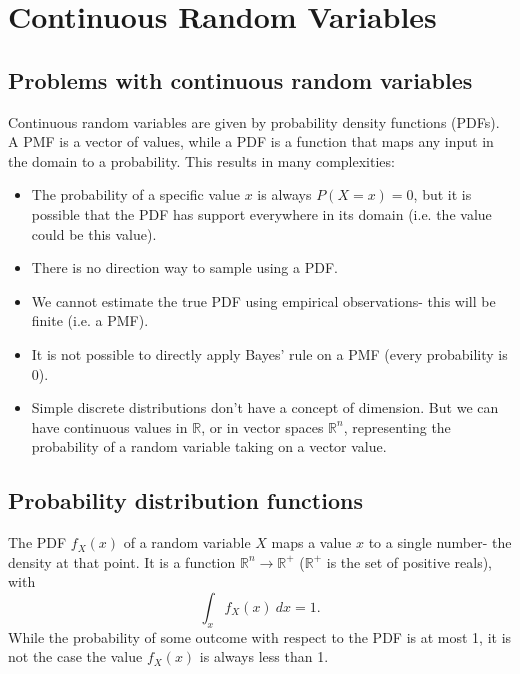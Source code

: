 \documentclass[a4paper, openany]{memoir}
\begin{document}
\section{Continuous Random Variables}
\subsection{Problems with continuous random variables}
Continuous random variables are given by probability density functions (PDFs). A PMF is a vector of values, while a PDF is a function that maps any input in the domain to a probability. This results in many complexities:
\begin{itemize}
    \item The probability of a specific value $x$ is always $P(X = x) = 0$, but it is possible that the PDF has support everywhere in its domain (i.e. the value could be this value).
    \item There is no direction way to sample using a PDF.
    \item We cannot estimate the true PDF using empirical observations- this will be finite (i.e. a PMF).
    \item It is not possible to directly apply Bayes' rule on a PMF (every probability is 0).
    \item Simple discrete distributions don't have a concept of dimension. But we can have continuous values in $\mathbb{R}$, or in vector spaces $\mathbb{R}^n$, representing the probability of a random variable taking on a vector value.
\end{itemize}

\subsection{Probability distribution functions}
The PDF $f_X(x)$ of a random variable $X$ maps a value $x$ to a single number- the density at that point. It is a function $\mathbb{R}^n \to \mathbb{R}^+$ ($\mathbb{R}^+$ is the set of positive reals), with
\[\int_x f_X(x) \ dx = 1.\]
While the probability of some outcome with respect to the PDF is at most 1, it is not the case the value $f_X(x)$ is always less than 1.
\end{document}
